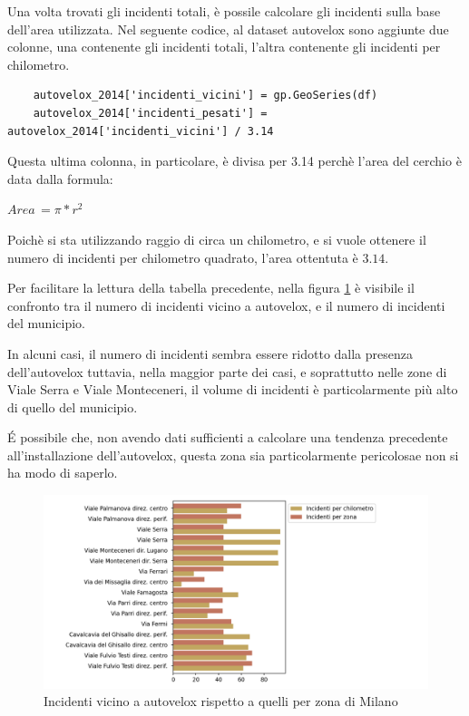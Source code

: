 \documentclass[a4paper]{report}
\begin{document}
Una volta trovati gli incidenti totali, è possile calcolare gli incidenti sulla base dell'area utilizzata.
Nel seguente codice, al dataset autovelox sono aggiunte due colonne, una contenente gli incidenti totali, 
l'altra contenente gli incidenti per chilometro.

\begin{lstlisting}
    autovelox_2014['incidenti_vicini'] = gp.GeoSeries(df)
    autovelox_2014['incidenti_pesati'] = autovelox_2014['incidenti_vicini'] / 3.14
\end{lstlisting}

Questa ultima colonna, in particolare, è divisa per 3.14 perchè l'area del cerchio è data dalla formula: 

\begin{center}
    $Area\, = \pi * r^2$
\end{center}

Poichè si sta utilizzando raggio di circa un chilometro, e si vuole ottenere il numero di incidenti per chilometro 
quadrato, l'area ottentuta è $3.14$.

Per facilitare la lettura della tabella precedente, nella figura \ref{fig:confronto-autovelox} è visibile il 
confronto tra il numero di incidenti vicino a autovelox, e il numero di incidenti del municipio.

In alcuni casi, il numero di incidenti sembra essere  ridotto dalla presenza dell'autovelox 
tuttavia, nella maggior parte dei casi, e soprattutto nelle zone di Viale Serra e Viale Monteceneri, 
il volume di incidenti è particolarmente più alto di quello del municipio.

\'E possibile che, non avendo dati sufficienti a calcolare una tendenza precedente all'installazione 
dell'autovelox, questa zona sia particolarmente pericolosae non si ha modo di saperlo.

\begin{figure}
    \includegraphics[width=\linewidth]{../src/municipi_milano/conclusioni_municipio.png}
    \caption{Incidenti vicino a autovelox rispetto a quelli per zona di Milano}
    \label{fig:confronto-autovelox}
\end{figure}
\end{document}
